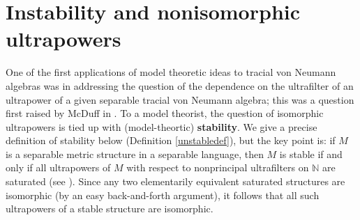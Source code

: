 \documentclass[12pt]{amsart}
\theoremstyle{definition}
\def\bb{\mathbb}
\def\bb{\mathbb}
\def\cal{\mathcal}
\DeclareMathOperator{\tr}{tr}
\newcommand\bC{{\mathbb C}}
\begin{document}



\section{Instability and nonisomorphic ultrapowers}

One of the first applications of model theoretic ideas to tracial von Neumann algebras was in addressing the question of the dependence on the ultrafilter of an ultrapower of a given separable tracial von Neumann algebra; this was a question first raised by McDuff in \cite{mcduff}.  To a model theorist, the question of isomorphic ultrapowers is tied up with (model-theortic) \textbf{stability}. We give a precise definition of stability below (Definition \ref{unstabledef}), but the key point is: if $M$ is a separable metric structure in a separable language, then $M$ is stable if and only if all ultrapowers of $M$ with respect to nonprincipal ultrafilters on $\bb N$ are saturated (see \cite[Theorem 5.6]{mtoa2}).  Since any two elementarily equivalent saturated structures are isomorphic (by an easy back-and-forth argument), it follows that all such ultrapowers of a stable structure are isomorphic.
\end{document}
